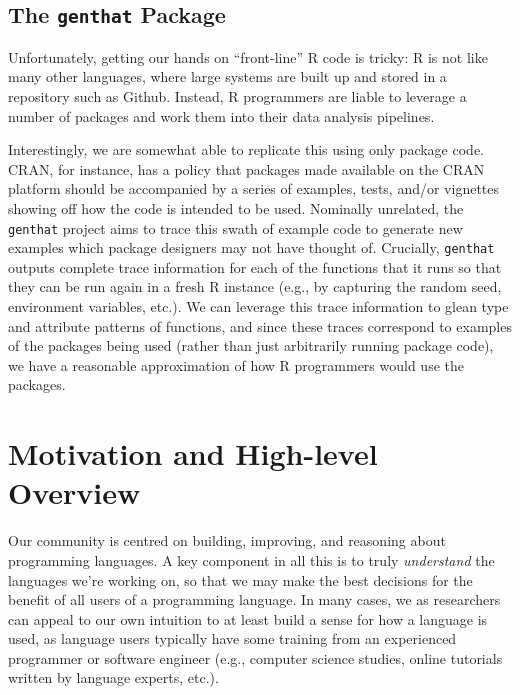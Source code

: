 \documentclass[acmsmall,10pt,review,anonymous]{acmart}\settopmatter{printfolios=true,printccs=false,printacmref=false}
\begin{document}


%
%
\subsection{The \texttt{genthat} Package}

Unfortunately, getting our hands on ``front-line'' R code is tricky:
R is not like many other languages, where large systems are built up and stored in a repository such as Github.
Instead, R programmers are liable to leverage a number of packages and work them into their data analysis pipelines.

Interestingly, we are somewhat able to replicate this using only package code.
CRAN, for instance, has a policy that packages made available on the CRAN platform should be accompanied by a series of examples, tests, and/or vignettes showing off how the code is intended to be used.
Nominally unrelated, the {\tt genthat} project aims to trace this swath of example code to generate new examples which package designers may not have thought of.
Crucially, {\tt genthat} outputs complete trace information for each of the functions that it runs so that they can be run again in a fresh R instance (e.g., by capturing the random seed, environment variables, etc.).
We can leverage this trace information to glean type and attribute patterns of functions, and since these traces correspond to examples of the packages being used (rather than just arbitrarily running package code), we have a reasonable approximation of how R programmers would use the packages.




%
%
%
%
%
%
\section{Motivation and High-level Overview}

Our community is centred on building, improving, and reasoning about
programming languages.  A key component in all this is to truly
\textit{understand} the languages we're working on, so that we may make the
best decisions for the benefit of all users of a programming language.  In
many cases, we as researchers can appeal to our own intuition to at least
build a sense for how a language is used, as language users typically have
some training from an experienced programmer or software engineer (e.g.,
computer science studies, online tutorials written by language experts,
etc.).  
\end{document}

